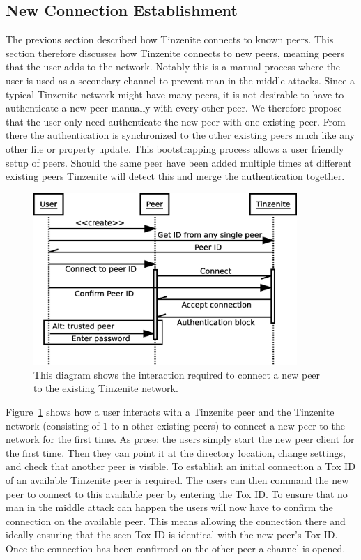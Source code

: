\subsection{New Connection Establishment}

The previous section described how Tinzenite connects to known peers.
This section therefore discusses how Tinzenite connects to new peers, meaning peers that the user adds to the network.
Notably this is a manual process where the user is used as a secondary channel to prevent man in the middle attacks.
Since a typical Tinzenite network might have many peers, it is not desirable to have to authenticate a new peer manually with every other peer.
We therefore propose that the user only need authenticate the new peer with one existing peer.
From there the authentication is synchronized to the other existing peers much like any other file or property update.
This bootstrapping process allows a user friendly setup of peers.
Should the same peer have been added multiple times at different existing peers Tinzenite will detect this and merge the authentication together.

\begin{figure}[htp]
\centering
    \includegraphics[width=10cm]{diagram/sequence_new_connect}
\caption[New Connection Sequence Diagram]{This diagram shows the interaction required to connect a new peer to the existing Tinzenite network.}
\label{diagram:new_connection}
\end{figure}

Figure~\ref{diagram:new_connection} shows how a user interacts with a Tinzenite peer and the Tinzenite network (consisting of 1 to n other existing peers) to connect a new peer to the network for the first time.
As prose: the users simply start the new peer client for the first time.
Then they can point it at the directory location, change settings, and check that another peer is visible.
To establish an initial connection a Tox ID of an available Tinzenite peer is required.
The users can then command the new peer to connect to this available peer by entering the Tox ID.
To ensure that no man in the middle attack can happen the users will now have to confirm the connection on the available peer.
This means allowing the connection there and ideally ensuring that the seen Tox ID is identical with the new peer's Tox ID.
Once the connection has been confirmed on the other peer a channel is opened.

